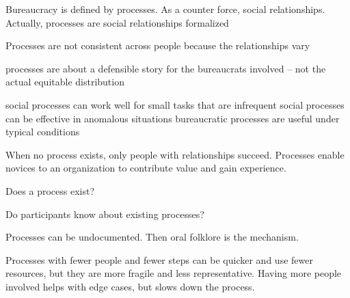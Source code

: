 Bureaucracy is defined by processes.
As a counter force, social relationships.
Actually, processes are social relationships formalized

Processes are not consistent across people because the relationships vary


processes are about a defensible story for the bureaucrats involved -- not the actual equitable distribution



social processes can work well for small tasks that are infrequent
social processes can be effective in anomalous situations
bureaucratic processes are useful under typical conditions

When no process exists, only people with relationships succeed. Processes enable novices to an organization to contribute value and gain experience. 





Does a process exist?

Do participants know about existing processes?

Processes can be undocumented. Then oral folklore is the mechanism. 

Processes with fewer people and fewer steps can be quicker and use fewer resources, but they are more fragile and less representative. Having more people involved helps with edge cases, but slows down the process. 


